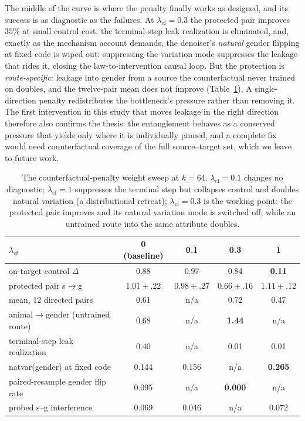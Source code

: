 \documentclass[11pt]{article}
\begin{document}
The middle of the curve is where the penalty finally works as designed, and
its success is as diagnostic as the failures. At $\lambda_{\mathrm{cf}}{=}0.3$
the protected pair improves $35\%$ at small control cost, the terminal-step
leak realization is eliminated, and, exactly as the mechanism account
demands, the denoiser's \emph{natural} gender flipping at fixed code is wiped
out: suppressing the variation mode suppresses the leakage that rides it,
closing the law-to-intervention causal loop. But the protection is
\emph{route-specific}: leakage into gender from a source the counterfactual
never trained on doubles, and the twelve-pair mean does not improve
(Table~\ref{tab:cf}). A single-direction penalty redistributes the
bottleneck's pressure rather than removing it. The first intervention in this
study that moves leakage in the right direction therefore also confirms the
thesis: the entanglement behaves as a conserved pressure that yields only
where it is individually pinned, and a complete fix would need counterfactual
coverage of the full source--target set, which we leave to future work.

\begin{table}[h]\centering\small
\begin{tabular}{l cccc}
$\lambda_{\mathrm{cf}}$ & 0 (baseline) & 0.1 & 0.3 & 1 \\
\hline
on-target control $\Delta$          & 0.88 & 0.97 & 0.84 & \textbf{0.11} \\
protected pair s$\to$g              & $1.01\!\pm\!.22$ & $0.98\!\pm\!.27$ & $\mathbf{0.66\!\pm\!.16}$ & $1.11\!\pm\!.12$ \\
mean, 12 directed pairs             & 0.61 & n/a & 0.72 & 0.47 \\
animal$\to$gender (untrained route) & 0.68 & n/a & \textbf{1.44} & n/a \\
terminal-step leak realization      & 0.40 & n/a & 0.01 & 0.01 \\
natvar(gender) at fixed code        & 0.144 & 0.156 & n/a & \textbf{0.265} \\
paired-resample gender flip rate    & 0.095 & n/a & \textbf{0.000} & n/a \\
probed s--g interference            & 0.069 & 0.046 & n/a & 0.072 \\
\end{tabular}
\caption{The counterfactual-penalty weight sweep at $k{=}64$.
$\lambda_{\mathrm{cf}}{=}0.1$ changes no diagnostic; $\lambda_{\mathrm{cf}}{=}1$
suppresses the terminal step but collapses control and doubles natural
variation (a distributional retreat); $\lambda_{\mathrm{cf}}{=}0.3$ is the
working point: the protected pair improves and its natural variation mode is
switched off, while an untrained route into the same attribute doubles.}
\label{tab:cf}
\end{table}
\end{document}
